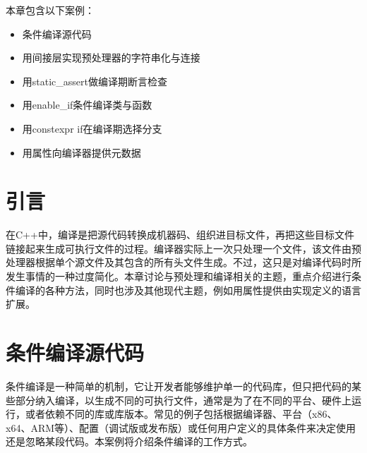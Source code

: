 
本章包含以下案例：



\begin{itemize}
\item 条件编译源代码



\item 用间接层实现预处理器的字符串化与连接



\item 用static\_assert做编译期断言检查



\item 用enable\_if条件编译类与函数



\item 用constexpr if在编译期选择分支



\item 用属性向编译器提供元数据

\end{itemize}



\section{引言}



在C++中，编译是把源代码转换成机器码、组织进目标文件，再把这些目标文件链接起来生成可执行文件的过程。编译器实际上一次只处理一个文件，该文件由预处理器根据单个源文件及其包含的所有头文件生成。不过，这只是对编译代码时所发生事情的一种过度简化。本章讨论与预处理和编译相关的主题，重点介绍进行条件编译的各种方法，同时也涉及其他现代主题，例如用属性提供由实现定义的语言扩展。



\section{条件编译源代码}



条件编译是一种简单的机制，它让开发者能够维护单一的代码库，但只把代码的某些部分纳入编译，以生成不同的可执行文件，通常是为了在不同的平台、硬件上运行，或者依赖不同的库或库版本。常见的例子包括根据编译器、平台（x86、x64、ARM等）、配置（调试版或发布版）或任何用户定义的具体条件来决定使用还是忽略某段代码。本案例将介绍条件编译的工作方式。


